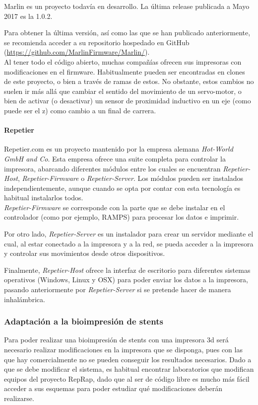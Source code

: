 \documentclass[a4paper,12pt]{article}
\begin{document}
Marlin es un proyecto todavía en desarrollo. La última release publicada a Mayo 2017 es la 1.0.2.

Para obtener la última versión, así como las que se han publicado anteriormente, se recomienda acceder a su repositorio hospedado en GitHub (\href{https://github.com/MarlinFirmware/Marlin/}{https://github.com/MarlinFirmware/Marlin/}).\\

Al tener todo el código abierto, muchas compañías ofrecen sus impresoras con modificaciones en el firmware. Habitualmente pueden ser encontradas en clones de este proyecto, o bien a través de ramas de estos. No obstante, estos cambios no suelen ir más allá que cambiar el sentido del movimiento de un servo-motor, o bien de activar (o desactivar) un sensor de proximidad inductivo en un eje (como puede ser el z) como cambio a un final de carrera.\\


\paragraph{Repetier}
Repetier.com es un proyecto mantenido por la empresa alemana \emph{Hot-World GmbH and Co}. Esta empresa ofrece una suite completa para controlar la impresora, abarcando diferentes módulos entre los cuales se encuentran \emph{Repetier-Host}, \emph{Repetier-Firmware} o \emph{Repetier-Server}. Los módulos pueden ser instalados independientemente, aunque cuando se opta por contar con esta tecnología es habitual instalarlos todos.\\

\emph{Repetier-Firmware} se corresponde con la parte que se debe instalar en el controlador (como por ejemplo, RAMPS) para procesar los datos e imprimir. 

Por otro lado, \emph{Repetier-Server} es un instalador para crear un servidor mediante el cual, al estar conectado a la impresora y a la red, se pueda acceder a la impresora y controlar sus movimientos desde otros dispositivos.

Finalmente, \emph{Repetier-Host} ofrece la interfaz de escritorio para diferentes sistemas operativos (Windows, Linux y OSX) para poder enviar los datos a la impresora, pasando anteriormente por \emph{Repetier-Server} si se pretende hacer de manera inhalámbrica.


\subsubsection{Adaptación a la bioimpresión de stents}
Para poder realizar una bioimpresión de stents con una impresora 3d será necesario realizar modificaciones en la impresora que se disponga, pues con las que hay comercialmente no se pueden conseguir los resultados necesarios. Dado a que se debe modificar el sistema, es habitual encontrar laboratorios que modifican equipos del proyecto RepRap, dado que al ser de código libre es mucho más fácil acceder a sus esquemas para poder estudiar qué modificaciones deberán realizarse.\\
\end{document}
